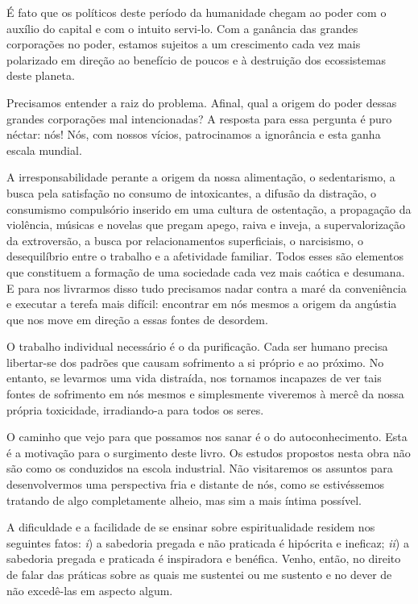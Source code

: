 \documentclass[oneside, 12pt]{book}
\begin{document}
É fato que os políticos deste período da humanidade chegam ao poder com o auxílio do capital e com o intuito servi-lo. Com a ganância das grandes corporações no poder, estamos sujeitos a um crescimento cada vez mais polarizado em direção ao benefício de poucos e à destruição dos ecossistemas deste planeta.

Precisamos entender a raiz do problema. Afinal, qual a origem do poder dessas grandes corporações mal intencionadas? A resposta para essa pergunta é puro néctar: nós! Nós, com nossos vícios, patrocinamos a ignorância e esta ganha escala mundial.

A irresponsabilidade perante a origem da nossa alimentação, o sedentarismo, a busca pela satisfação no consumo de intoxicantes, a difusão da distração, o consumismo compulsório inserido em uma cultura de ostentação, a propagação da violência, músicas e novelas que pregam apego, raiva e inveja, a supervalorização da extroversão, a busca por relacionamentos superficiais, o narcisismo, o desequilíbrio entre o trabalho e a afetividade familiar. Todos esses são elementos que constituem a formação de uma sociedade cada vez mais caótica e desumana. E para nos livrarmos disso tudo precisamos nadar contra a maré da conveniência e executar a terefa mais difícil: encontrar em nós mesmos a origem da angústia que nos move em direção a essas fontes de desordem.

O trabalho individual necessário é o da purificação. Cada ser humano precisa libertar-se dos padrões que causam sofrimento a si próprio e ao próximo. No entanto, se levarmos uma vida distraída, nos tornamos incapazes de ver tais fontes de sofrimento em nós mesmos e simplesmente viveremos à mercê da nossa própria toxicidade, irradiando-a para todos os seres.

O caminho que vejo para que possamos nos sanar é o do autoconhecimento. Esta é a motivação para o surgimento deste livro. Os estudos propostos nesta obra não são como os conduzidos na escola industrial. Não visitaremos os assuntos para desenvolvermos uma perspectiva fria e distante de nós, como se estivéssemos tratando de algo completamente alheio, mas sim a mais íntima possível.

A dificuldade e a facilidade de se ensinar sobre espiritualidade residem nos seguintes fatos: \textit{i}) a sabedoria pregada e não praticada é hipócrita e ineficaz; \textit{ii}) a sabedoria pregada e praticada é inspiradora e benéfica. Venho, então, no direito de falar das práticas sobre as quais me sustentei ou me sustento e no dever de não excedê-las em aspecto algum.
\end{document}
